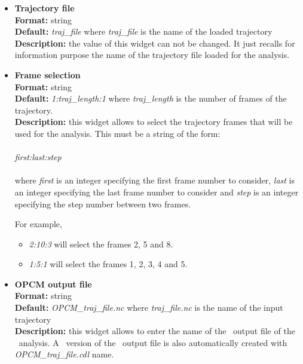 \documentclass[a4paper,11pt]{report}
\begin{document}
\hypertarget{opcm_trajectory_file}{}
\begin{itemize}
\item \textbf{Trajectory file}\\
\textbf{Format:} string\\
\textbf{Default:} \textit{traj\_file} where \textit{traj\_file} is the name of the loaded trajectory\\
\textbf{Description:} the value of this widget can not be changed. It just recalls for information purpose the name
of the trajectory file loaded for the analysis.

\hypertarget{opcm_frame_selection}{}
\item \textbf{Frame selection}\\
\textbf{Format:} string\\
\textbf{Default:} \textit{1:traj\_length:1} where \textit{traj\_length} is the number of frames of the trajectory.\\
\textbf{Description:} this widget allows to select the trajectory frames that will be used for the analysis. This must
be a string of the form:
\\\\
\textit{first:last:step}
\\\\
where \textit{first} is an integer specifying the first frame number to consider, \textit{last} is an integer specifying the last 
frame number to consider and \textit{step} is an integer specifying the step number between two frames.

For example,
\begin{itemize}
\item \textit{2:10:3} will select the frames 2, 5 and 8.
\item \textit{1:5:1} will select the frames 1, 2, 3, 4 and 5.
\end{itemize}

\hypertarget{opcm_opcm_output_file}{}
\item \textbf{OPCM output file}\\
\textbf{Format:} string\\
\textbf{Default:} \textit{OPCM\_traj\_file.nc} where \textit{traj\_file.nc} is the name of the input trajectory\\
\textbf{Description:} this widget allows to enter the name of the \NetCDF\ output file of the \OPCM\ analysis. A \CDL\ 
version of the \NetCDF\ output file is also automatically created with \textit{OPCM\_traj\_file.cdl} name.
\end{itemize}
\end{document}
